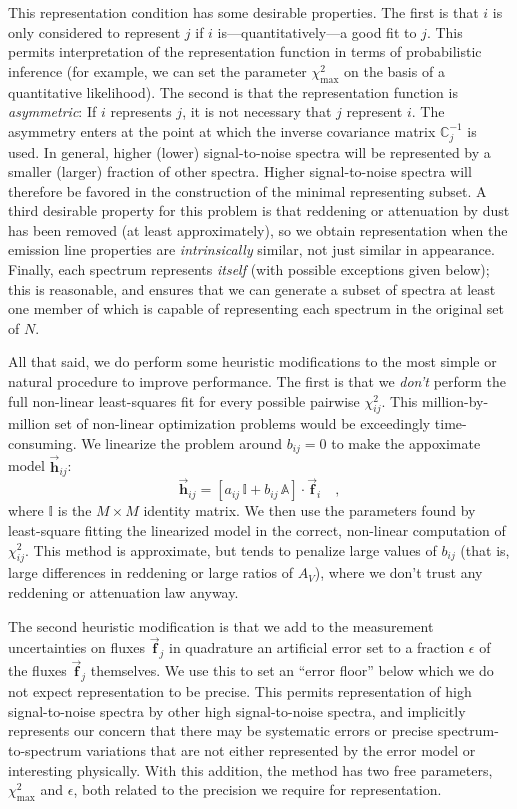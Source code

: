 \documentclass[12pt,letterpaper]{article}
\newcommand{\aij}{a_{ij}}
\newcommand{\bij}{b_{ij}}
\newcommand{\chisqij}{\chi^2_{ij}}
\newcommand{\chisqmax}{\chi^2_{\mathrm{max}}}
\newcommand{\datavec}[1]{\vec{\boldsymbol{#1}}}
\newcommand{\vfi}{\datavec{f}_{\!i}}
\newcommand{\vfj}{\datavec{f}_{\!j}}
\newcommand{\vfapproxij}{\datavec{h}_{ij}}
\newcommand{\datamatrix}[1]{\mathbb{#1}}
\newcommand{\identity}{\datamatrix{I}}
\newcommand{\reddening}{\datamatrix{A}}
\newcommand{\invcovarj}{\datamatrix{C}^{-1}_{j}}
\begin{document}
This representation condition has some desirable properties.  The
first is that $i$ is only considered to represent $j$ if $i$
is---quantitatively---a good fit to $j$.  This permits interpretation
of the representation function in terms of probabilistic inference
(for example, we can set the parameter $\chisqmax$ on the basis of a
quantitative likelihood).  The second is that the representation
function is \emph{asymmetric}: If $i$ represents $j$, it is not
necessary that $j$ represent $i$.  The asymmetry enters at the point
at which the inverse covariance matrix $\invcovarj$ is used.  In
general, higher (lower) signal-to-noise spectra will be represented by
a smaller (larger) fraction of other spectra.  Higher signal-to-noise
spectra will therefore be favored in the construction of the minimal
representing subset.  A third desirable property for this problem is
that reddening or attenuation by dust has been removed (at least
approximately), so we obtain representation when the emission line
properties are \emph{intrinsically} similar, not just similar in
appearance.  Finally, each spectrum represents \emph{itself} (with
possible exceptions given below); this is reasonable, and ensures that
we can generate a subset of spectra at least one member of which is
capable of representing each spectrum in the original set of $N$.

All that said, we do perform some heuristic modifications to the most
simple or natural procedure to improve performance.  The first is that
we \emph{don't} perform the full non-linear least-squares fit for
every possible pairwise $\chisqij$.  This million-by-million set of
non-linear optimization problems would be exceedingly time-consuming.
We linearize the problem around $\bij=0$ to make the appoximate model
$\vfapproxij$:
\begin{equation}
\vfapproxij= \left[\aij\,\identity + \bij\,\reddening\right]\cdot\vfi
\quad,
\end{equation}
where $\identity$ is the $M\times M$ identity matrix.  We then use the
parameters found by least-square fitting the linearized model in the
correct, non-linear computation of $\chisqij$.  This method is
approximate, but tends to penalize large values of $\bij$ (that is,
large differences in reddening or large ratios of $A_V$), where we don't
trust any reddening or attenuation law anyway.

The second heuristic modification is that we add to the measurement
uncertainties on fluxes $\vfj$ in quadrature an artificial error set
to a fraction $\epsilon$ of the fluxes $\vfj$ themselves.  We use this
to set an ``error floor'' below which we do not expect representation
to be precise.  This permits representation of high signal-to-noise
spectra by other high signal-to-noise spectra, and implicitly
represents our concern that there may be systematic errors or precise
spectrum-to-spectrum variations that are not either represented by the
error model or interesting physically.  With this addition, the method
has two free parameters, $\chisqmax$ and $\epsilon$, both related to
the precision we require for representation.

\end{document}
